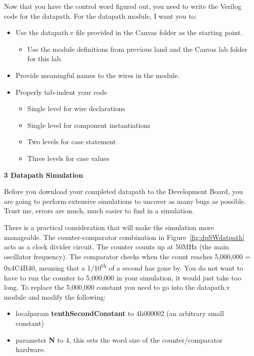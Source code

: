 \begin{Figure}
Now that you have the control word figured out, you need to write the
Verilog code for the datapath. For the datapath module, I want you to:

\begin{itemize}
\item
  Use the datapath.v file provided in the Canvas folder as the starting
  point.

  \begin{itemize}
  \item
    Use the module definitions from previous land and the Canvas lab
    folder for this lab.
  \end{itemize}
\item
  Provide meaningful names to the wires in the module.
\item
  Properly tab-indent your code

  \begin{itemize}
  \item
    Single level for wire declarations
  \item
    Single level for component instantiations
  \item
    Two levels for case statement
  \item
    Three levels for case values
  \end{itemize}
\end{itemize}

\textbf{3 Datapath Simulation}

Before you download your completed datapath to the Development Board,
you are going to perform extensive simulations to uncover as many bugs
as possible. Trust me, errors are much, much easier to find in a
simulation.

There is a practical consideration that will make the simulation more
manageable. The counter-comparator combination in Figure~\ref{fig:dpSWdatpath} acts as a
clock divider circuit. The counter counts up at 50MHz (the main
oscillator frequency). The comparator checks when the count reaches
5,000,000 = 0x4C4B40, meaning that a 1/10\textsuperscript{th} of a
second has gone by. You do not want to have to run the counter to
5,000,000 in your simulation, it would just take too long. To replace
the 5,000,000 constant you need to go into the datapath.v module and
modify the following:

\begin{itemize}
\item
  localparam \textbf{tenthSecondConstant} to 4\textquotesingle h000002
  (an arbitrary small constant)
\item
  parameter \textbf{N} to 4, this sets the word size of the
  counter/comparator hardware.
\end{itemize}


\end{Figure}
